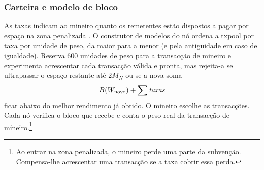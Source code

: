 \subsubsection*{Carteira e modelo de bloco}

%
As taxas indicam ao mineiro quanto os remetentes estão dispostos a pagar por
espaço na zona penalizada \cite{articmine-36c3-dynamics}. O construtor
de modelos do nó ordena a txpool por taxa por unidade de peso, da maior para a
menor (e pela antiguidade em caso de igualdade). Reserva 600 unidades de peso
para a transacção de mineiro e experimenta acrescentar cada transacção válida
e pronta, mas rejeita-a se ultrapassar o espaço restante até $2M_N$ ou se a
nova soma
\begin{align*}
B(W_{\rm novo})+\sum\mathit{taxas}
\end{align*}
ficar abaixo do melhor rendimento já obtido. O mineiro escolhe as transacções.
Cada nó verifica o bloco que recebe e conta o peso real da transacção de
mineiro.\footnote{\label{penaltyzonecost_footnote} Ao entrar na zona
penalizada, o mineiro perde uma parte da subvenção. Compensa-lhe acrescentar
uma transacção se a taxa cobrir essa perda.}


